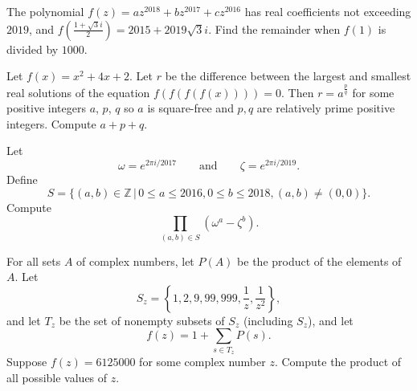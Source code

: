 %	













\begin{question}[name={2019 AIME II, \href{https://artofproblemsolving.com/community/c4p12030059}{Problem 8}}]
	The polynomial $f(z)=az^{2018}+bz^{2017}+cz^{2016}$ has real coefficients not exceeding $2019$, and $f(\tfrac{1+\sqrt{3}i}{2})=2015+2019\sqrt{3}i$. Find the remainder when $f(1)$ is divided by $1000$.	
\end{question}


%	








\begin{question}[name={2019 PUMaC, Algebra, \href{https://artofproblemsolving.com/community/c4p13718042}{Problem 2}}]
	Let $f(x)=x^2+4x+2$. Let $r$ be the difference between the largest and smallest real solutions of the equation $f(f(f(f(x))))=0$. Then $r=a^{\frac{p}{q}}$ for some positive integers $a$, $p$, $q$ so $a$ is square-free and $p,q$ are relatively prime positive integers. Compute $a+p+q$.
\end{question}







\begin{question}[name={2019 PUMaC, Algebra, \href{https://artofproblemsolving.com/community/c4p13718106}{Problem 5}}]
	Let $$\omega=e^{{2\pi i}/{2017}} \qquad \text{and} \qquad \zeta = e^{{2\pi i}/{2019}}.$$ Define $$S=\{(a,b)\in\mathbb{Z}\,|\,0\leq a \leq 2016, 0 \leq b \leq 2018, (a,b)\neq (0,0)\}.$$ Compute
	$$\prod_{(a,b)\in S}(\omega^a-\zeta^b).$$
\end{question}





\begin{question}[name={2019 PUMaC, Team Round, \href{https://artofproblemsolving.com/community/c4p23950991}{Problem 7}}]
	For all sets $A$ of complex numbers, let $P(A)$ be the product of the elements of $A$. Let $$S_z = \left\{1, 2, 9, 99, 999, \frac{1}{z},\frac{1}{z^2}\right\},$$ and let $T_z$ be the set of nonempty subsets of $S_z$ (including $S_z$), and let $$f(z) = 1 + \sum_{s\in T_z} P(s).$$ Suppose $f(z) = 6125000$ for some complex number $z$. Compute the product of all possible values of $z$.	
\end{question}




